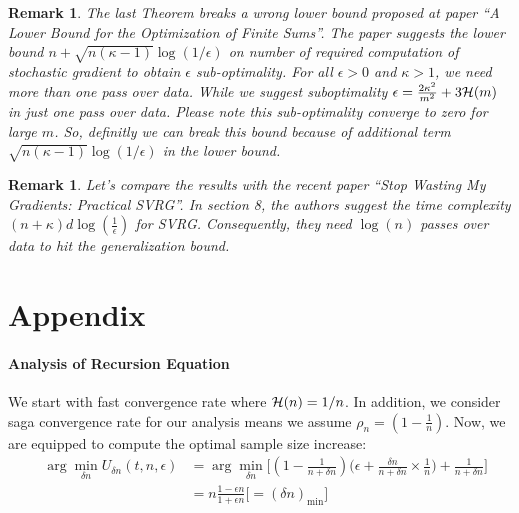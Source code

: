 \documentclass{article}
\newtheorem{remark}[definition]{Remark}
\newcommand{\bound}{{\cal H}}
\begin{document}
\begin{remark}
	The last Theorem breaks a wrong lower bound proposed at paper ``A Lower Bound
	for the Optimization of Finite Sums''. The paper suggests the lower bound $n+
	\sqrt{n(\kappa -1 )}\log(1/\epsilon)$ on number of required computation of
	stochastic gradient to obtain $\epsilon$ sub-optimality. For all $\epsilon>0$
	and $\kappa>1$, we need more than one pass over data. While we suggest
	suboptimality $\epsilon = \frac{2\kappa^2}{m^2} + 3 \bound(m)$ in just one pass
	over data. Please note this sub-optimality converge to zero for large $m$. So, definitly we can break this
	bound because of additional term $\sqrt{n(\kappa -1 )}\log(1/\epsilon)$ in the
	lower bound.
\end{remark}
\begin{remark}
	Let's compare the results with the recent paper ``Stop Wasting My Gradients:
	Practical SVRG''. In section 8, the authors suggest the time complexity 
	$(n+\kappa)d \log(\frac{1}{\epsilon})$ for SVRG. Consequently, they need
	$\log(n)$ passes over data to hit the generalization bound.
\end{remark}
\section{Appendix}
\paragraph{Analysis of Recursion Equation} 
We start with fast
convergence rate where $\bound(n) = 1/n$. In addition, we consider saga convergence rate for our
analysis means we assume $\rho_n = (1-\frac{1}{n})$. Now, we are equipped to
compute the optimal sample size increase: 
\begin{eqnarray*}
	& \arg \min_{\delta n} U_{\delta n}(t,n,\epsilon) & = \arg \min_{\delta
	n}\bigg[(1-\frac{1}{n+\delta n})\bigg(\epsilon + \frac{\delta n}{n+\delta n}
	\times \frac{1}{n}\bigg) + \frac{1}{n+\delta n}\bigg] \\
	& & = n \frac{1- \epsilon n}{1+\epsilon n } \bigg[= (\delta
	n)_{\min}\bigg]
\end{eqnarray*}
\end{document}
